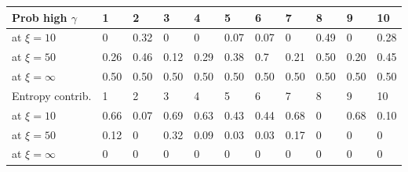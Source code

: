 
\begin{tabular}{| l | l | l | l |l |l |l |l |l |l |l |}
    \hline
    Prob high $\gamma$ & 1 & 2 & 3 & 4 & 5 & 6 & 7 & 8& 9& 10\\ \hline
    at $\xi = 10$ & 0 &	0.32 &	0 &	0 &	0.07 & 	0.07 &	0 &	0.49 &	0 &	0.28\\
    \hline
     at $\xi = 50$ & 0.26 &	0.46 &	0.12 &	0.29 &	0.38 &	0.7 &	0.21 &	0.50 &	0.20 &	0.45\\
     \hline
     at $\xi = \infty$ & 0.50 &	0.50 &	0.50 & 0.50 &	0.50 &	0.50 &	0.50 &	0.50 &	0.50 &	0.50\\
     \hline
     \hline
    Entropy contrib. & 1 & 2 & 3 & 4 & 5 & 6 & 7 & 8& 9& 10\\
     \hline
    at $\xi = 10$ & 0.66 &	0.07 &	0.69 &	0.63 &	0.43 &	0.44 &	0.68 &	0 & 0.68 & 0.10\\
     \hline
    at $\xi = 50$ & 0.12 &	0 &	0.32 &	0.09 &	0.03 &	0.03 &	0.17 &	0 &	0&	0\\
    \hline
    at $\xi = \infty$ & 0 &	0 &	0 & 0 &	0 &	0 & 	0 & 	0 &	0 &	0\\
    \hline

    \end{tabular}
